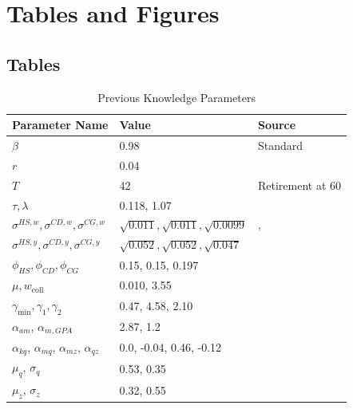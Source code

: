 
\section{Tables and Figures}


%
%
\subsection{Tables}

  \begin{table}[H]
    \begin{tabular}{lll}
      \toprule
      \textbf{Parameter Name} & \textbf{Value} & \textbf{Source} \\
      \midrule
      $\beta$ & 0.98 & Standard \\
      $r$ & 0.04 & \\
      \midrule
      $T$ & 42 & Retirement at 60 \\
      \midrule
      $\tau, \lambda$ & 0.118, 1.07 & \cite{HeathcoteStoreslettenViolante2017} \\
      \midrule
      $\sigma^{HS, w}, \sigma^{CD, w}, \sigma^{CG, w}$ & $\sqrt{0.011}, \sqrt{0.011}, \sqrt{0.0099}$ & \cite{Guvenen2009}, \cite{CarrollSamwick1997} \\
      $\sigma^{HS, y}, \sigma^{CD, y}, \sigma^{CG, y}$ & $\sqrt{0.052}, \sqrt{0.052}, \sqrt{0.047}$ & \\
      \midrule
      $\phi_{HS}, \phi_{CD}, \phi_{CG}$ & 0.15, 0.15, 0.197 & \cite{HendricksLeukhina2017} \\
      $\mu, w_{\text{coll}}$ & 0.010, 3.55 & \\
      $\gamma_\text{min}, \gamma_1, \gamma_2$ & 0.47, 4.58, 2.10 & \\
      $\alpha_{am}$, $\alpha_{m,GPA}$ & 2.87, 1.2 & \\
      $\alpha_{kq}$, $\alpha_{mq}$, $\alpha_{mz}$, $\alpha_{qz}$ & 0.0, -0.04, 0.46, -0.12 & \\
      $\mu_q$, $\sigma_q$ & 0.53, 0.35 & \\
      $\mu_z$, $\sigma_z$ & 0.32, 0.55 & \\
      \bottomrule
    \end{tabular}
    \caption{Previous Knowledge Parameters}
    \label{table:pk}
  \end{table}

